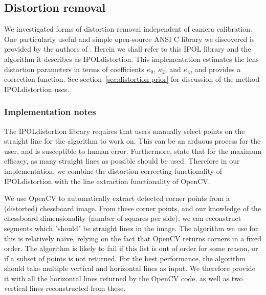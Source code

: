 
\subsection{Distortion removal}
\label{sec:distortion}

We investigated forms of distortion removal independent of camera calibration. One particularly useful and simple open-source ANSI C library we discovered is provided by the authors of \cite{algebraic-distortion}. Herein we shall refer to this IPOL library and the algorithm it describes as IPOLdistortion. This implementation estimates the lens distortion parameters in terms of coefficients $\kappa_{0}$, $\kappa_{2}$, and $\kappa_{4}$, and provides a correction function. See section~\ref{sec:distortion-prior} for discussion of the method IPOLdistortion uses.

\subsubsection{Implementation notes}

The IPOLdistortion library requires that users manually select points on the straight line for the algorithm to work on. This can be an arduous process for the user, and is susceptible to human error. Furthermore, \cite{algebraic-distortion} state that for the maximum efficacy, as many straight lines as possible should be used. Therefore in our implementation, we combine the distortion correcting functionality of IPOLdistortion with the line extraction functionality of OpenCV. 

We use OpenCV to automatically extract detected corner points from a (distorted) chessboard image. From these corner points, and our knowledge of the chessboard dimensionality (number of squares per side), we can reconstruct segments which "should" be straight lines in the image. The algorithm we use for this is relatively naive, relying on the fact that OpenCV returns corners in a fixed order. The algorithm is likely to fail if this list is out of order for some reason, or if a subset of points is not returned. For the best performance, the algorithm should take multiple vertical and horizontal lines as input. We therefore provide it with all the horizontal lines returned by the OpenCV code, as well as two vertical lines reconstructed from these.


